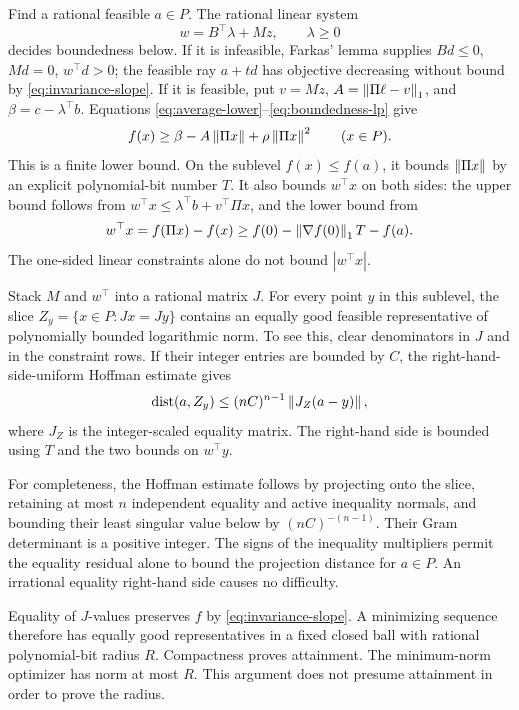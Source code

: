 Find a rational feasible $a\in P$. The rational linear system
\begin{equation}\label{eq:boundedness-lp}
 w=B^\top\lambda+Mz,\qquad\lambda\ge0
\end{equation}
decides boundedness below. If it is infeasible, Farkas' lemma supplies
$Bd\le0$, $Md=0$, $w^\top d>0$; the feasible ray $a+td$ has objective
decreasing without bound by \eqref{eq:invariance-slope}. If it is feasible,
put $v=Mz$, $A=\left\lVert\Pi\ell-v\right\rVert_1$, and $\beta=c-\lambda^\top b$.
Equations \eqref{eq:average-lower}--\eqref{eq:boundedness-lp} give
\begin{equation}\label{eq:quotient-bound}
 f(x)\ge\beta-A\left\lVert\Pi x\right\rVert+\rho\left\lVert\Pi x\right\rVert^2\qquad(x\in P).
\end{equation}
This is a finite lower bound. On the sublevel $f(x)\le f(a)$, it bounds
$\left\lVert\Pi x\right\rVert$ by an explicit polynomial-bit number $T$. It also bounds
$w^\top x$ on both sides: the upper bound follows from
$w^\top x\le\lambda^\top b+v^\top\Pi x$, and the lower bound from
\[
 w^\top x=f(\Pi x)-f(x)
       \ge f(0)-\left\lVert\nabla f(0)\right\rVert_1T-f(a).
\]
The one-sided linear constraints alone do not bound $|w^\top x|$.

Stack $M$ and $w^\top$ into a rational matrix $J$. For every point $y$
in this sublevel, the slice
$Z_y=\{x\in P:Jx=Jy\}$ contains an equally good feasible representative
of polynomially bounded logarithmic norm. To see this, clear denominators
in $J$ and in the constraint rows. If their integer entries are bounded by
$C$, the right-hand-side-uniform Hoffman estimate gives
\begin{equation}\label{eq:hoffman-radius}
 \operatorname{dist}(a,Z_y)\le(nC)^{n-1}\left\lVert J_Z(a-y)\right\rVert,
\end{equation}
where $J_Z$ is the integer-scaled equality matrix. The right-hand side is
bounded using $T$ and the two bounds on $w^\top y$.

For completeness, the Hoffman estimate follows by projecting onto the
slice, retaining at most $n$ independent equality and active inequality
normals, and bounding their least singular value below by
$(nC)^{-(n-1)}$. Their Gram determinant is a positive integer. The signs
of the inequality multipliers permit the equality residual alone to bound
the projection distance for $a\in P$. An irrational equality right-hand
side causes no difficulty.

Equality of $J$-values preserves $f$ by \eqref{eq:invariance-slope}.
A minimizing sequence therefore has equally good representatives in a fixed
closed ball with rational polynomial-bit radius $R$. Compactness proves
attainment. The minimum-norm optimizer has norm at most $R$. This argument
does not presume attainment in order to prove the radius.

